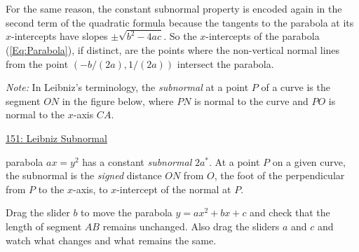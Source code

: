 \documentclass{ximera}
\begin{document}

For the same reason, the constant subnormal property is encoded again in the second term of the quadratic formula because the tangents to the parabola at its $x$-intercepts have slopes $\pm \sqrt{b^2-4ac}$. So the $x$-intercepts of the parabola (\ref{Eq:Parabola}), if distinct, are the points where the non-vertical normal lines from the point $(-b/(2a), 1/(2a))$ intersect the parabola.

\emph{Note:} In Leibniz's terminology, the \emph{subnormal} at a point $P$ of a curve is the segment $ON$ in the figure below, where $PN$ is normal to the curve and $PO$ is normal to the $x$-axis $CA$. 

\begin{onlineOnly}
    \begin{center}
\end{center}
\end{onlineOnly}

\href{https://www.desmos.com/calculator/yizwz5sfrf}{151: Leibniz Subnormal}



parabola $ax=y^2$ has a constant \emph{subnormal} $2a^*$. At a point $P$ on a given curve, the subnormal is the \emph{signed} distance $ON$ from $O$, the foot of the perpendicular from $P$ to the $x$-axis, to $x$-intercept of the normal at $P$. %

\begin{exploration}\label{exp:cq1}
Drag the slider $b$ to move the parabola $y=ax^2 +bx+c$ and check that the length of segment $AB$ remains unchanged. Also drag the sliders $a$ and $c$ and watch what changes and what remains the same.
 
 
\begin{onlineOnly}
    \begin{center}
 
\end{center}
\end{onlineOnly}
\end{exploration}
\end{document}

